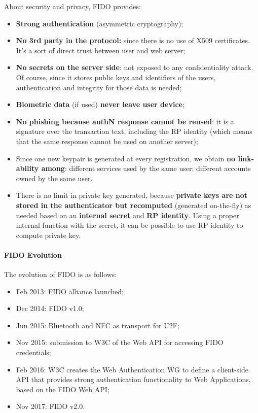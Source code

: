 About security and privacy, FIDO provides:
\begin{itemize}
	\item \textbf{Strong authentication} (asymmetric cryptography);
	\item \textbf{No 3rd party in the protocol:} since there is no use of X509 certificates. It's a sort of direct trust between user and web server;
	\item \textbf{No secrets on the server side}: not exposed to any confidentiality attack. Of course, since it stores public keys and identifiers of the users, authentication and integrity for those data is needed;
	\item \textbf{Biometric data} (if used) \textbf{never leave user device};
	\item \textbf{No phishing because authN response cannot be reused}: it is a signature over the transaction text, including the RP identity (which means that the same response cannot be used on another server);
	\item Since one new keypair is generated at every registration, we obtain \textbf{no link-ability among}: different services used by the same user; different accounts owned by the same user.
	\item There is no limit in private key generated, because \textbf{private keys are not stored in the authenticator but recomputed} (generated on-the-fly) as needed based on an \textbf{internal secret} and \textbf{RP identity}. Using a proper internal function with the secret, it can be possible to use RP identity to compute private key.
\end{itemize}

\paragraph{FIDO Evolution}

The evolution of FIDO is as follows:
\begin{itemize}
	\item Feb 2013: FIDO alliance launched;
	\item Dec 2014: FIDO v1.0;
	\item Jun 2015: Bluetooth and NFC as transport for U2F;
	\item Nov 2015: submission to W3C of the Web API for accessing FIDO credentials;
	\item Feb 2016: W3C creates the Web Authentication WG to define a client-side API that provides strong authentication functionality to Web Applications, based on the FIDO Web API;
	\item Nov 2017: FIDO v2.0.
\end{itemize}

